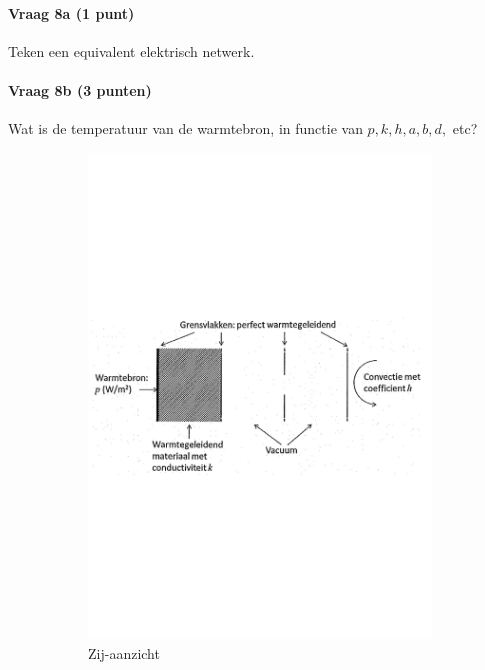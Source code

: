 \documentclass[a4paper]{article}
\begin{document}
\paragraph{Vraag 8a (1 punt)}
Teken een equivalent elektrisch netwerk.

\paragraph{Vraag 8b (3 punten)}
Wat is de temperatuur van de warmtebron, in functie van $p, k, h, a, b, d,$ etc?

\begin{figure}[ht]
    \centering
    \begin{subfigure}[b]{0.5\textwidth}
        \includegraphics[width=\textwidth]{vraag8-1}
        \caption{Zij-aanzicht}
        \label{fig:vraag81}
    \end{subfigure}%
    \begin{subfigure}[b]{0.5\textwidth}

\end{subfigure}
\end{figure}
\end{document}
